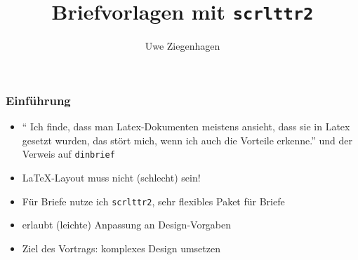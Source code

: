 \documentclass[12pt,ngerman]{beamer}
\author{Uwe Ziegenhagen}
\title{Briefvorlagen mit \texttt{scrlttr2}}
\begin{document}
\begin{frame}

\maketitle

\end{frame}

\begin{frame}
\frametitle{Einführung}

\begin{itemize}
\item \enquote{ Ich finde, dass man Latex-Dokumenten meistens ansieht, dass sie in Latex gesetzt wurden, das stört mich, wenn ich auch die Vorteile erkenne.} und der Verweis auf \texttt{dinbrief}
\item \LaTeX-Layout muss nicht (schlecht) sein!
\item Für Briefe nutze ich \texttt{scrlttr2}, sehr flexibles Paket für Briefe
\item erlaubt (leichte) Anpassung an Design-Vorgaben
\item Ziel des Vortrags: komplexes Design umsetzen
\end{itemize}
\end{frame}

\begin{frame}[fragile]
\frametitle{}

TeX},morekeywords={opening, closing}]{brief-01.tex}

\end{frame}
\end{document}
